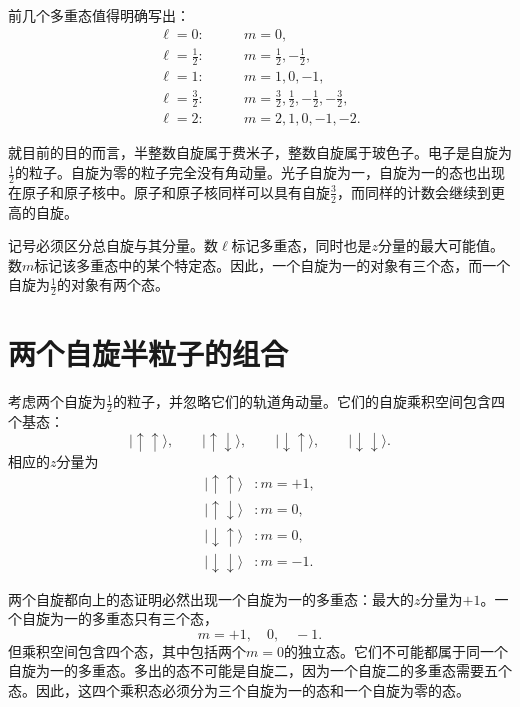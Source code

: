 前几个多重态值得明确写出：
\begin{align}
\ell=0:&\qquad m=0,\\
\ell=\frac12:&\qquad m=\frac12,-\frac12,\\
\ell=1:&\qquad m=1,0,-1,\\
\ell=\frac32:&\qquad
m=\frac32,\frac12,-\frac12,-\frac32,\\
\ell=2:&\qquad m=2,1,0,-1,-2.
\end{align}

就目前的目的而言，半整数自旋属于费米子，整数自旋属于玻色子。电子是自旋为\(\tfrac12\)的粒子。自旋为零的粒子完全没有角动量。光子自旋为一，自旋为一的态也出现在原子和原子核中。原子和原子核同样可以具有自旋\(\tfrac32\)，而同样的计数会继续到更高的自旋。

记号必须区分总自旋与其分量。数\(\ell\)标记多重态，同时也是\(z\)分量的最大可能值。数\(m\)标记该多重态中的某个特定态。因此，一个自旋为一的对象有三个态，而一个自旋为\(\tfrac12\)的对象有两个态。

\section{两个自旋半粒子的组合}

考虑两个自旋为\(\tfrac12\)的粒子，并忽略它们的轨道角动量。它们的自旋乘积空间包含四个基态：
\begin{equation}
|\uparrow\uparrow\rangle,\qquad
|\uparrow\downarrow\rangle,\qquad
|\downarrow\uparrow\rangle,\qquad
|\downarrow\downarrow\rangle.
\end{equation}
相应的\(z\)分量为
\begin{align}
|\uparrow\uparrow\rangle &: m=+1,\\
|\uparrow\downarrow\rangle &: m=0,\\
|\downarrow\uparrow\rangle &: m=0,\\
|\downarrow\downarrow\rangle &: m=-1.
\end{align}

两个自旋都向上的态证明必然出现一个自旋为一的多重态：最大的\(z\)分量为\(+1\)。一个自旋为一的多重态只有三个态，
\begin{equation}
m=+1,\quad 0,\quad -1.
\end{equation}
但乘积空间包含四个态，其中包括两个\(m=0\)的独立态。它们不可能都属于同一个自旋为一的多重态。多出的态不可能是自旋二，因为一个自旋二的多重态需要五个态。因此，这四个乘积态必须分为三个自旋为一的态和一个自旋为零的态。

